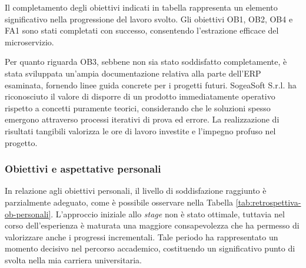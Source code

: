         \vspace{0.2 em}
        \noindent Il completamento degli obiettivi indicati in tabella rappresenta un elemento significativo nella progressione del lavoro svolto. Gli obiettivi OB1, OB2, OB4 e FA1 sono stati completati con successo, consentendo l'estrazione efficace del microservizio.

        \vspace{0.2 em}
        \noindent Per quanto riguarda OB3, sebbene non sia stato soddisfatto completamente, è stata sviluppata un'ampia documentazione relativa alla parte dell'ERP esaminata, fornendo linee guida concrete per i progetti futuri. SogeaSoft S.r.l. ha riconosciuto il valore di disporre di un prodotto immediatamente operativo rispetto a concetti puramente teorici, considerando che le soluzioni spesso emergono attraverso processi iterativi di prova ed errore. La realizzazione di risultati tangibili valorizza le ore di lavoro investite e l'impegno profuso nel progetto.

        
        \subsubsection{Obiettivi e aspettative personali}

        In relazione agli obiettivi personali, il livello di soddisfazione raggiunto è parzialmente adeguato, come è possibile osservare nella Tabella \ref{tab:retrospettiva-ob-personali}. L'approccio iniziale allo \textit{stage} non è stato ottimale, tuttavia nel corso dell'esperienza è maturata una maggiore consapevolezza che ha permesso di valorizzare anche i progressi incrementali. Tale periodo ha rappresentato un momento decisivo nel percorso accademico, costituendo un significativo punto di svolta nella mia carriera universitaria.

